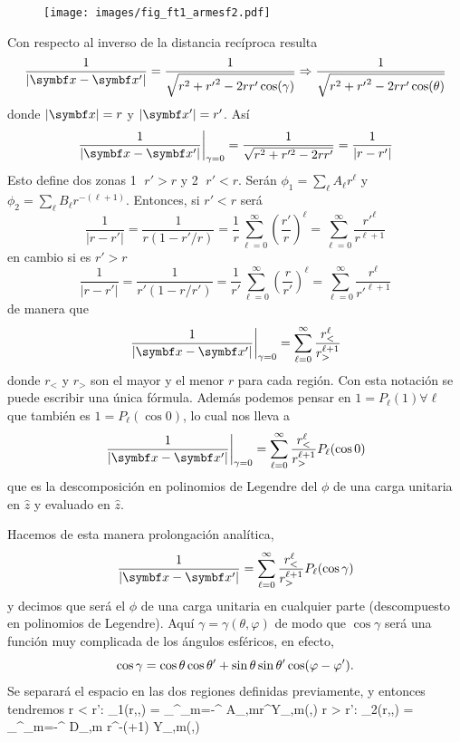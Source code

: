 \documentclass[10pt,oneside]{CBFT_book}
\begin{document}
\begin{figure}[tb]
	\begin{center}
	\texttt{[image: images/fig\_ft1\_armesf2.pdf]}	 
	\end{center}
	\caption{}
\end{figure} 

Con respecto al inverso de la distancia recíproca resulta
\[
	\frac{1}{|\vb{x}-\vb{x}'|} = \frac{1}{\sqrt{r^2 + {r'}^2  - 2rr'\cos(\gamma)}} \Rightarrow
	\frac{1}{\sqrt{r^2 + {r'}^2  - 2rr'\cos(\theta)}}
\]
donde $|\vb{x}|=r$ y $|\vb{x}'|=r'$. Así
\[
	\left. \frac{1}{|\vb{x}-\vb{x}'|} \right|_{\gamma=0} = \frac{1}{\sqrt{r^2 + r'^2 -2rr'}}=
	\frac{1}{|r-r'|}
\]
Esto define dos zonas \textcircled{1} $r'>r$ y \textcircled{2} $r'<r$.
Serán $\phi_1 = \sum_\ell A_\ell r^\ell$ y $\phi_2 = \sum_\ell B_\ell r^{-(\ell+1)}$.
Entonces, si $r'<r$ será
\[
	\frac{1}{|r-r'|} = \frac{1}{r(1 - r'/r )} = \frac{1}{r} \sum_{\ell=0}^\infty \left(\frac{r'}{r}\right)^\ell = 
	\sum_{\ell=0}^\infty \frac{r'^\ell}{r^{\ell+1}}
\]
en cambio si es $r'>r$
\[
	\frac{1}{|r-r'|} = \frac{1}{r'(1 - r/r' )} = \frac{1}{r'} \sum_{\ell=0}^\infty \left(\frac{r}{r'}\right)^\ell = 
	\sum_{\ell=0}^\infty \frac{r^\ell}{r'^{\ell+1}}
\]
de manera que
\[
	\left. \frac{1}{|\vb{x}-\vb{x}'|} \right|_{\gamma=0} = \sum_{\ell=0}^\infty  \frac{r_<^\ell}{r_>^{\ell+1}}
\]
donde $r_<$ y $r_>$ son el mayor y el menor $r$ para cada región.
Con esta notación se puede escribir una única fórmula.
Además podemos pensar en $1 = P_\ell( 1 ) \forall \ell$ que también es $ 1 = P_\ell(\cos 0 )$, 
lo cual nos lleva a 
\[
	\left. \frac{1}{|\vb{x}-\vb{x}'|} \right|_{\gamma=0} = \sum_{\ell=0}^\infty  \frac{r_<^\ell}{r_>^{\ell+1}}
	P_\ell(\cos 0)
\]
que es la descomposición en polinomios de Legendre del $\phi$ de una carga unitaria
en $\hat{z}$ y evaluado en $\hat{z}$.

Hacemos de esta manera prolongación analítica,
\[
	\frac{1}{|\vb{x}-\vb{x}'|}  = \sum_{\ell=0}^\infty  \frac{r_<^\ell}{r_>^{\ell+1}}
	P_\ell(\cos \gamma)
\]
y decimos que será el $\phi$ de una carga unitaria en cualquier parte
(descompuesto en polinomios de Legendre).
Aquí $\gamma=\gamma(\theta,\varphi)$ de modo que $\cos\gamma$  será una función muy complicada de los ángulos
esféricos, en efecto,
\[
	\cos\gamma = \cos \theta \cos \theta' + \sin \theta \sin \theta' \cos( \varphi - \varphi').
\]
Se separará el espacio en las dos regiones definidas previamente,
y entonces tendremos
\be
	r < r': \qquad 
	\phi_1(r,\theta,\varphi) = 
	\sum_{}^\infty \sum_{m=-\ell}^\ell 
	A_{\ell,m}r^\ell  Y_{\ell,m}(\theta,\varphi)
	\label{phi_1}
\ee
\be
	r > r': \qquad 
	\phi_2(r,\theta,\varphi) = 
	\sum_{}^\infty \sum_{m=-\ell}^\ell 
	D_{\ell,m} r^{-(\ell+1)} Y_{\ell,m}(\theta,\varphi)
	\label{phi_2}
\ee
\end{document}
